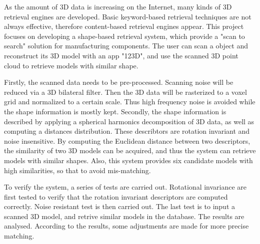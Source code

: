 As the amount of 3D data is increasing on the Internet, many kinds of 3D retrieval engines are developed. Basic keyword-based retrieval techniques are not always effective, therefore content-based retrieval engines appear. This project focuses on developing a shape-based retrieval system, which provide a "scan to search" solution for manufacturing components. The user can scan a object and reconstruct its 3D model with an app "123D", and use the scanned 3D point cloud to retrieve models with similar shape. 

Firstly, the scanned data needs to be pre-processed. Scanning noise will be reduced via a 3D bilateral filter. Then the 3D data will be rasterized to a voxel grid and normalized to a certain scale. Thus high frequency noise is avoided while the shape information is mostly kept. Secondly, the shape information is described by applying a spherical harmonics decomposition of 3D data, as well as computing a distances distribution. These describtors are rotation invariant and noise insensitive. By computing the Euclidean distance between two descriptors, the similarity of two 3D models can be acquired, and thus the system can retrieve models with similar shapes. Also, this system provides six candidate models with high similarities, so that to avoid mis-matching. 

To verify the system, a series of tests are carried out. Rotational invariance are first tested to verify that the rotation invariant descriptors are computed correctly. Noise resistant test is then carried out. The last test is to input a scanned 3D model, and retrive similar models in the database. The results are analysed. According to the results, some adjustments are made for more precise matching. 